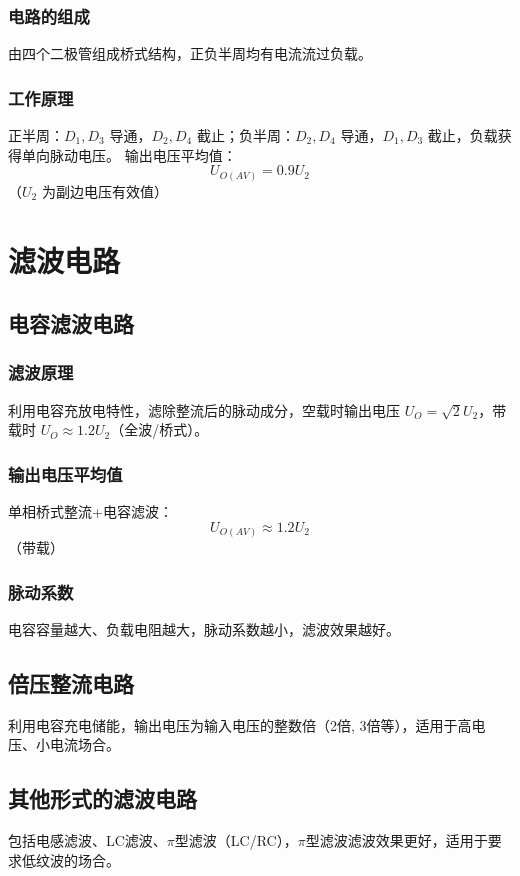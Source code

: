 \subsubsection{电路的组成}
由四个二极管组成桥式结构，正负半周均有电流流过负载。

\subsubsection{工作原理}
正半周：$D_1, D_3$ 导通，$D_2, D_4$ 截止；负半周：$D_2, D_4$ 导通，$D_1, D_3$ 截止，负载获得单向脉动电压。
输出电压平均值：
\[ U_{O(AV)} = 0.9U_2 \]（$U_2$ 为副边电压有效值）

\section{滤波电路}
\subsection{\texorpdfstring{电容滤波电路}{电容滤波电路}}
\subsubsection{滤波原理}
利用电容充放电特性，滤除整流后的脉动成分，空载时输出电压 $U_O = \sqrt{2}U_2$，带载时 $U_O \approx 1.2U_2$（全波/桥式）。

\subsubsection{输出电压平均值}
单相桥式整流+电容滤波：
\[ U_{O(AV)} \approx 1.2U_2 \]（带载）

\subsubsection{脉动系数}
电容容量越大、负载电阻越大，脉动系数越小，滤波效果越好。

\subsection{倍压整流电路}
利用电容充电储能，输出电压为输入电压的整数倍（2倍, 3倍等），适用于高电压、小电流场合。

\subsection{其他形式的滤波电路}
包括电感滤波、LC滤波、$\pi$型滤波（LC/RC），$\pi$型滤波滤波效果更好，适用于要求低纹波的场合。

